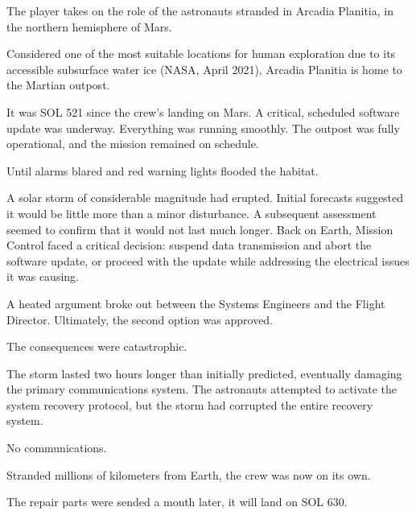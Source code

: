 \indent

The player takes on the role of the astronauts stranded in Arcadia Planitia, in the northern hemisphere of Mars.

Considered one of the most suitable locations for human exploration due to its accessible subsurface water ice (NASA, April 2021), Arcadia Planitia is home to the Martian outpost.

It was SOL 521 since the crew's landing on Mars. A critical, scheduled software update was underway. Everything was running smoothly. The outpost was fully operational, and the mission remained on schedule.

Until alarms blared and red warning lights flooded the habitat.

A solar storm of considerable magnitude had erupted. Initial forecasts suggested it would be little more than a minor disturbance. A subsequent assessment seemed to confirm that it would not last much longer. Back on Earth, Mission Control faced a critical decision: suspend data transmission and abort the software update, or proceed with the update while addressing the electrical issues it was causing.

A heated argument broke out between the Systems Engineers and the Flight Director. Ultimately, the second option was approved.

The consequences were catastrophic.

The storm lasted two hours longer than initially predicted, eventually damaging the primary communications system. The astronauts attempted to activate the system recovery protocol, but the storm had corrupted the entire recovery system.

No communications.

Stranded millions of kilometers from Earth, the crew was now on its own.

The repair parts were sended a month later, it will land on SOL 630. 

